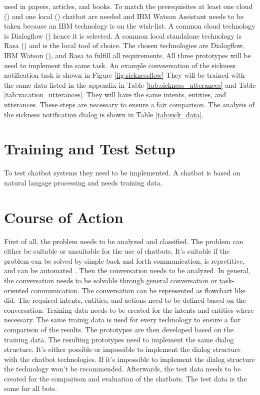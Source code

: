 used in papers, articles, and books.
To match the prerequisites at least one cloud (\citet{braunEvaluatingNLU, rahman2017programming}) and one local (\citet{braunEvaluatingNLU}) chatbot are needed and IBM Watson Assistant needs to be taken because an IBM technology is on the wish-list.
A common cloud technology is Dialogflow (\citet{braunEvaluatingNLU, dutta2017developing, singhbuilding, buiildChatbotsPython, rahman2017programming, ieee2018watson}) hence it is selected.
A common local standalone technology is Rasa (\citet{braunEvaluatingNLU, singhbuilding, rasabocklisch2017, buiildChatbotsPython, gregori2017evaluation}) and is the local tool of choice.
The chosen technologies are Dialogflow, IBM Watson (\citet{rahman2017programming, pharmacybot, ieee2018watson, gregori2017evaluation}), and Rasa to fulfill all requirements.
All three prototypes will be used to implement the same task.
An example convsersation of the sickness notification task is shown in Figure \ref{fig:sicknessflow}
They will be trained with the same data listed in the appendix 
in Table \ref{tab:sickness_utterances} and Table \ref{tab:vacation_utterances}.
They will have the same intents, entities, and utterances.
These steps are necessary to ensure a fair comparison.
The analysis of the sickness notification dialog is shown in Table \ref{tab:sick_data}.

\section{Training and Test Setup}
To test chatbot systems they need to be implemented.
A chatbot is based on natural langage processing and needs training data.


\section{Course of Action} %
First of all, the problem needs to be analyzed and classified.
The problem can either be suitable or unsuitable for the use of chatbots.
It's suitable if the problem can be solved by simple back and forth communication,
is repretitive, and can be automated \citet{singhbuilding}.
Then the conversation needs to be analyzed.
In general, the conversation needs to be solvable through general conversation or 
task-oriented communication.
The conversation can be represented as flowchart like \citet{singhbuilding} did.
The required intents, entities, and actions need to be defined based on the conversation.
Training data needs to be created for the intents and entities where necessary.
The same trainig data is used for every technology to ensure a fair 
comparison of the results.
The prototypes are then developed based on the training data.
The resulting prototypes need to implement the same dialog structure.
It's either possible or impossible to implement the dialog structure with the 
chatbot technologies. 
If it's impossible to implement the dialog structure the technology 
won't be recommended.
Afterwards, the test data needs to be created for the comparison and evaluation of 
the chatbots.
The test data is the same for all bots.


